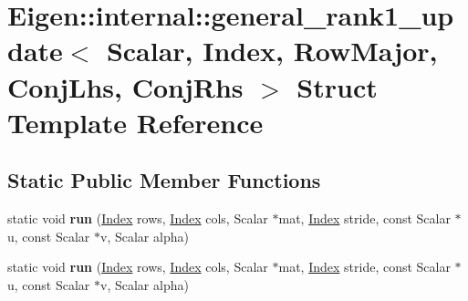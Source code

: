 \hypertarget{struct_eigen_1_1internal_1_1general__rank1__update_3_01_scalar_00_01_index_00_01_row_major_00_01_conj_lhs_00_01_conj_rhs_01_4}{}\section{Eigen\+:\+:internal\+:\+:general\+\_\+rank1\+\_\+update$<$ Scalar, Index, Row\+Major, Conj\+Lhs, Conj\+Rhs $>$ Struct Template Reference}
\label{struct_eigen_1_1internal_1_1general__rank1__update_3_01_scalar_00_01_index_00_01_row_major_00_01_conj_lhs_00_01_conj_rhs_01_4}
\subsection*{Static Public Member Functions}
\begin{DoxyCompactItemize}
\item 
\mbox{\label{struct_eigen_1_1internal_1_1general__rank1__update_3_01_scalar_00_01_index_00_01_row_major_00_01_conj_lhs_00_01_conj_rhs_01_4_adfd658f2b02dfd15df00ee79ded0a530}} 
static void {\bfseries run} (\hyperlink{namespace_eigen_a62e77e0933482dafde8fe197d9a2cfde}{Index} rows, \hyperlink{namespace_eigen_a62e77e0933482dafde8fe197d9a2cfde}{Index} cols, Scalar $\ast$mat, \hyperlink{namespace_eigen_a62e77e0933482dafde8fe197d9a2cfde}{Index} stride, const Scalar $\ast$u, const Scalar $\ast$v, Scalar alpha)
\item 
\mbox{\label{struct_eigen_1_1internal_1_1general__rank1__update_3_01_scalar_00_01_index_00_01_row_major_00_01_conj_lhs_00_01_conj_rhs_01_4_adfd658f2b02dfd15df00ee79ded0a530}} 
static void {\bfseries run} (\hyperlink{namespace_eigen_a62e77e0933482dafde8fe197d9a2cfde}{Index} rows, \hyperlink{namespace_eigen_a62e77e0933482dafde8fe197d9a2cfde}{Index} cols, Scalar $\ast$mat, \hyperlink{namespace_eigen_a62e77e0933482dafde8fe197d9a2cfde}{Index} stride, const Scalar $\ast$u, const Scalar $\ast$v, Scalar alpha)
\end{DoxyCompactItemize}


